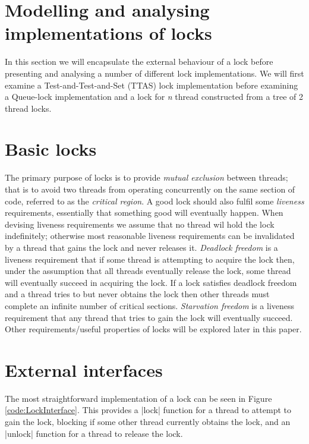 \section{Modelling and analysing implementations of locks}
\label{sec:locks}




In this section we will encapsulate the external behaviour of a lock before presenting and analysing a number of different lock implementations. We will first examine a Test-and-Test-and-Set (TTAS) lock implementation\cite{TAoMP} before examining a Queue-lock implementation and a lock for \textit{n} thread constructed from a tree of 2 thread locks.

\section{Basic locks}

The primary purpose of locks is to provide \emph{mutual exclusion} between threads; that is to avoid two threads from operating concurrently on the same section of code, referred to as the \emph{critical region}. A good lock should also fulfil some \emph{liveness} requirements, essentially that something good will eventually happen. When devising liveness requirements we assume that no thread wil hold the lock indefinitely; otherwise most reasonable liveness requirements can be invalidated by a thread that gains the lock and never releases it. \emph{Deadlock freedom} is a liveness requirement that if some thread is attempting to acquire the lock then, under the assumption that all threads eventually release the lock, some thread will eventually succeed in acquiring the lock. If a lock satisfies deadlock freedom and a thread tries to but never obtains the lock then other threads must complete an infinite number of critical sections. \emph{Starvation freedom} is a liveness requirement that any thread that tries to gain the lock will eventually succeed. Other requirements/useful properties of locks will be explored later in this paper.

\section{External interfaces}

The most straightforward implementation of a lock can be seen in Figure \ref{code:LockInterface}. This provides a |lock| function for a thread to attempt to gain the lock, blocking if some other thread currently obtains the lock, and an |unlock| function for a thread to release the lock. 


